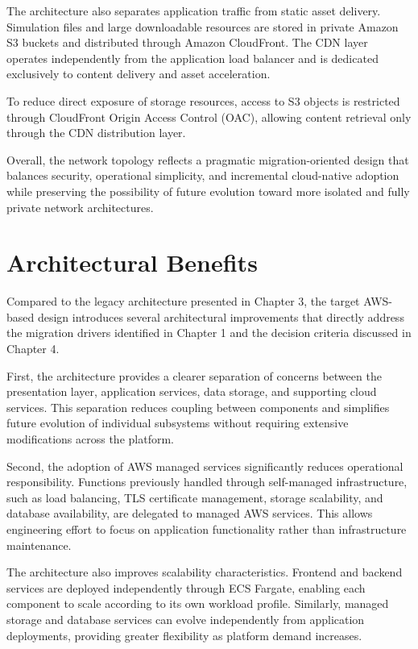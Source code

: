 The architecture also separates application traffic from static asset delivery. Simulation files and large downloadable resources are stored in private Amazon S3 buckets and distributed through Amazon CloudFront. The CDN layer operates independently from the application load balancer and is dedicated exclusively to content delivery and asset acceleration.

To reduce direct exposure of storage resources, access to S3 objects is restricted through CloudFront Origin Access Control (OAC), allowing content retrieval only through the CDN distribution layer.

Overall, the network topology reflects a pragmatic migration-oriented design that balances security, operational simplicity, and incremental cloud-native adoption while preserving the possibility of future evolution toward more isolated and fully private network architectures.

\section{Architectural Benefits}

Compared to the legacy architecture presented in Chapter 3, the target AWS-based design introduces several architectural improvements that directly address the migration drivers identified in Chapter 1 and the decision criteria discussed in Chapter 4.

First, the architecture provides a clearer separation of concerns between the presentation layer, application services, data storage, and supporting cloud services. This separation reduces coupling between components and simplifies future evolution of individual subsystems without requiring extensive modifications across the platform.

Second, the adoption of AWS managed services significantly reduces operational responsibility. Functions previously handled through self-managed infrastructure, such as load balancing, TLS certificate management, storage scalability, and database availability, are delegated to managed AWS services. This allows engineering effort to focus on application functionality rather than infrastructure maintenance.

The architecture also improves scalability characteristics. Frontend and backend services are deployed independently through ECS Fargate, enabling each component to scale according to its own workload profile. Similarly, managed storage and database services can evolve independently from application deployments, providing greater flexibility as platform demand increases.

